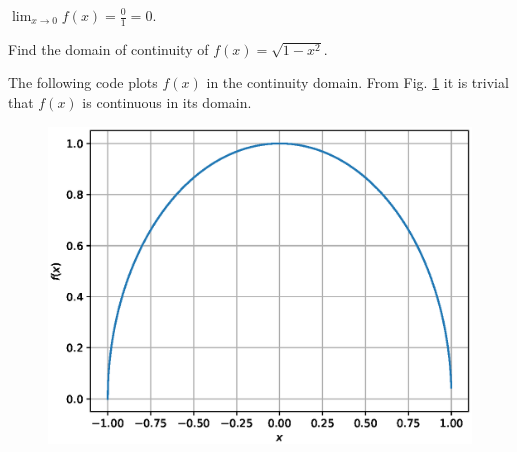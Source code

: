 \documentclass[journal,12pt,twocolumn]{IEEEtran}
\begin{document}
$\lim_{x\to 0}f(x)=\frac{0}{1}=0$. 
%
\begin{problem}
Find the domain of continuity of $f(x)=\sqrt{1-x^2}$.
\end{problem}
\solution The following code plots $f(x)$ in the continuity domain. From Fig. \ref{fig:6} it is trivial that $f(x)$ is continuous in its domain.

\begin{figure}[!ht]
\begin{center}
\includegraphics[width=\columnwidth]{./figs/6.eps}
\end{center}
\label{fig:6}	
\end{figure} 
\end{document}
